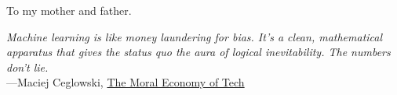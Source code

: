 

\copyrightpage  %

\commcertpage   %

\titlepage      %


\begin{dedication}		%
\begin{center}
    To my mother and father.
\end{center}
\end{dedication}

\begin{epigraph}		%
    \begin{center}
        \textit{Machine learning is like money laundering for bias.  It’s a clean, mathematical apparatus that gives the status quo the aura of logical inevitability. The numbers don’t lie.}
        \\\hspace{4em}---Maciej Ceglowski, \href{https://idlewords.com/talks/sase_panel.htm}{The Moral Economy of Tech}
    \end{center}
\end{epigraph}

